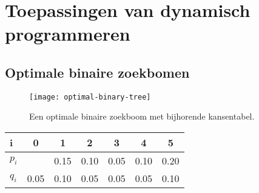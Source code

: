 \chapter{Toepassingen van dynamisch programmeren}
\section{Optimale binaire zoekbomen}
\begin{figure}[ht]
    \centering
    \texttt{[image: optimal-binary-tree]}
    \caption{Een optimale binaire zoekboom met bijhorende kansentabel.}
    \label{}
\end{figure}

\begin{table}[ht]
    \centering
    \begin{tabular}{l | c c c c c c}
        i & 0 & 1 & 2 & 3 & 4 & 5 \\
        \hline
        $p_i$ & & 0.15 & 0.10 & 0.05 & 0.10 & 0.20 \\
        $q_i$ & 0.05 & 0.10 & 0.05 &0.05 &0.05 & 0.10  
    \end{tabular}
\end{table}
